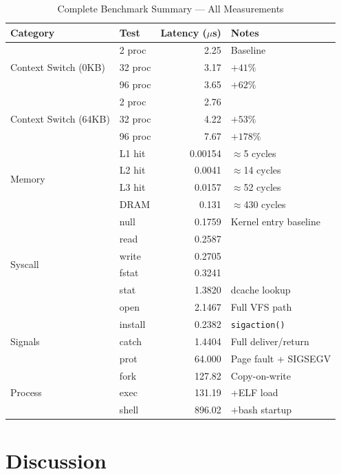 \documentclass[12pt,a4paper]{article}
\newcommand{\us}{$\mu$s}
\begin{document}
\begin{table}[H]
\centering
\caption{Complete Benchmark Summary — All Measurements}
\label{tab:summary}
\begin{tabular}{llrl}
\toprule
\textbf{Category} & \textbf{Test} & \textbf{Latency (\us)} & \textbf{Notes} \\
\midrule
\multirow{3}{*}{Context Switch (0KB)} &
  2 proc   &  2.25 & Baseline \\
& 32 proc  &  3.17 & $+41\%$ \\
& 96 proc  &  3.65 & $+62\%$ \\
\midrule
\multirow{3}{*}{Context Switch (64KB)} &
  2 proc   &  2.76 & \\
& 32 proc  &  4.22 & $+53\%$ \\
& 96 proc  &  7.67 & $+178\%$ \\
\midrule
\multirow{4}{*}{Memory} &
  L1 hit   & 0.00154 & $\approx$5 cycles \\
& L2 hit   & 0.0041  & $\approx$14 cycles \\
& L3 hit   & 0.0157  & $\approx$52 cycles \\
& DRAM     & 0.131   & $\approx$430 cycles \\
\midrule
\multirow{6}{*}{Syscall} &
  null     & 0.1759 & Kernel entry baseline \\
& read     & 0.2587 & \\
& write    & 0.2705 & \\
& fstat    & 0.3241 & \\
& stat     & 1.3820 & dcache lookup \\
& open     & 2.1467 & Full VFS path \\
\midrule
\multirow{3}{*}{Signals} &
  install  &  0.2382 & \texttt{sigaction()} \\
& catch    &  1.4404 & Full deliver/return \\
& prot     & 64.000  & Page fault + SIGSEGV \\
\midrule
\multirow{3}{*}{Process} &
  fork     & 127.82  & Copy-on-write \\
& exec     & 131.19  & +ELF load \\
& shell    & 896.02  & +bash startup \\
\bottomrule
\end{tabular}
\end{table}

\section{Discussion}
\label{sec:discuss}
\end{document}

